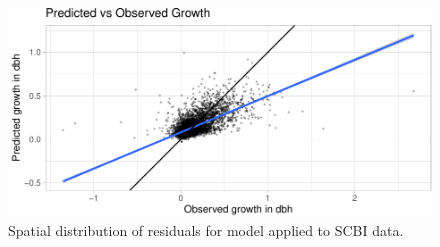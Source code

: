\documentclass[12pt]{article}
\begin{document}
\begin{figure}

{\centering \includegraphics[width=1\linewidth]{Figures/scbi-model-residuals-1} 

}

\caption{Spatial distribution of residuals for model applied to SCBI data.}\label{fig:scbi-model-residuals}
\end{figure}
\end{document}
